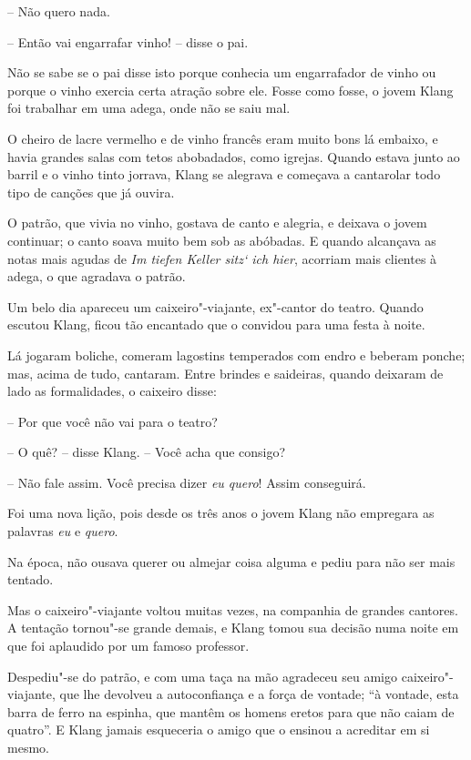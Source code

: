 -- Não quero nada.

-- Então vai engarrafar vinho! -- disse o pai.

Não se sabe se o pai disse isto porque conhecia um engarrafador de vinho
ou porque o vinho exercia certa atração sobre ele. Fosse como fosse, o
jovem Klang foi trabalhar em uma adega, onde não se saiu mal.

O cheiro de lacre vermelho e de vinho francês eram muito bons lá
embaixo, e havia grandes salas com tetos abobadados, como igrejas.
Quando estava junto ao barril e o vinho tinto jorrava, Klang se
alegrava e começava a cantarolar todo tipo de canções que já ouvira.

O patrão, que vivia no vinho, gostava de canto e alegria, e deixava o
jovem continuar; o canto soava muito bem sob as abóbadas. E quando
alcançava as notas mais agudas de \textit{Im tiefen Keller
sitz` ich hier}, acorriam mais clientes à adega, o que agradava o patrão.

Um belo dia apareceu um caixeiro"-viajante, ex"-cantor do teatro.
Quando escutou Klang, ficou tão encantado que o convidou para uma festa
à noite.

Lá jogaram boliche, comeram lagostins temperados com endro e beberam
ponche; mas, acima de tudo, cantaram. Entre brindes e saideiras, quando
deixaram de lado as formalidades, o caixeiro disse:

-- Por que você não vai para o teatro?

-- O quê? -- disse Klang. -- Você acha que consigo?

-- Não fale assim. Você precisa dizer \textit{eu quero}! Assim
conseguirá.

Foi uma nova lição, pois desde os três anos o jovem Klang não empregara
as palavras \textit{eu} e \textit{quero}.

Na época, não ousava querer ou almejar coisa alguma e pediu para não ser
mais tentado.

Mas o caixeiro"-viajante voltou muitas vezes, na companhia de grandes
cantores. A tentação tornou"-se grande demais, e Klang tomou sua
decisão numa noite em que foi aplaudido por um famoso professor.

Despediu"-se do patrão, e com uma taça na mão agradeceu seu amigo
caixeiro"-viajante, que lhe devolveu a autoconfiança e a força de
vontade; ``à vontade, esta barra de ferro na espinha, que mantêm os
homens eretos para que não caiam de quatro''. E Klang jamais esqueceria
o amigo que o ensinou a acreditar em si mesmo.

